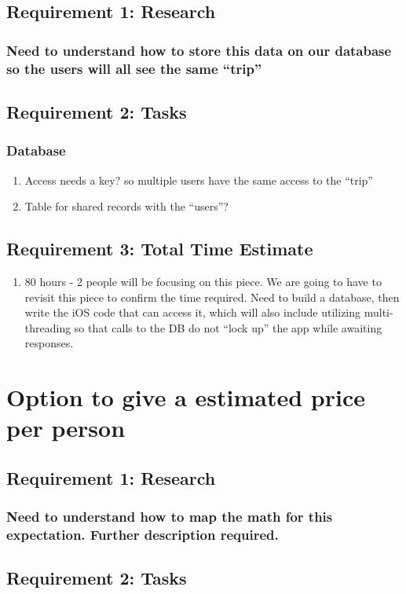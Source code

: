 \documentclass [10pt] {article}
\begin{document}
\subsection{Requirement 1: Research}
\subsubsection{Need to understand how to store this data on our database so the users will all see the same ``trip''}
\subsection{Requirement 2: Tasks}
\subsubsection{Database}
\begin{enumerate}
\item Access needs a key? so multiple users have the same access to the ``trip''
\item Table for shared records with the ``users''?
\end{enumerate}
\subsection{Requirement 3: Total Time Estimate}
\begin{enumerate}
\item 80 hours - 2 people will be focusing on this piece.  We are going to have to revisit this piece to confirm the time required.  Need to build a database, then write the iOS code that can access it, which will also include utilizing multi-threading so that calls to the DB do not ``lock up'' the app while awaiting responses.
\end{enumerate}

\section{Option to give a estimated price per person}
\subsection{Requirement 1: Research}
\subsubsection{Need to understand how to map the math for this expectation. Further description required.}
\subsection{Requirement 2: Tasks}
\end{document}
